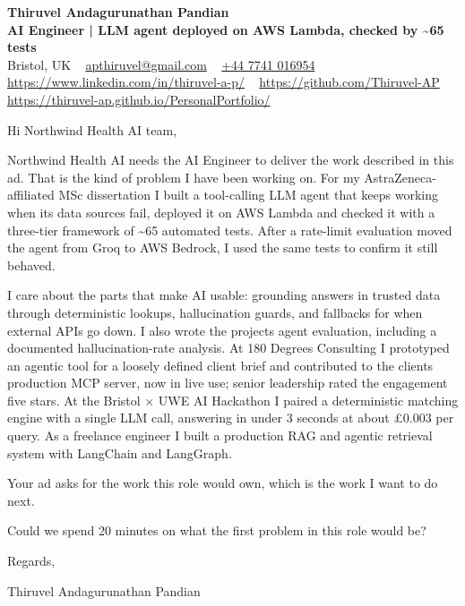 \documentclass[11pt,a4paper]{article}
\newcommand{\num}[1]{\textbf{#1}}   %
\begin{document}
\raggedright
\pagestyle{empty}

\begin{center}
    {\LARGE \color{linkblue} \textbf{Thiruvel Andagurunathan Pandian}}\\[0.2cm]
    {\color{headernavy}\small\textbf{AI Engineer | LLM agent deployed on AWS Lambda, checked by \num{\textasciitilde{}65} tests}}\\[0.2cm]
    {\small Bristol, UK\nobreak\ \,\textbar\, \href{mailto:apthiruvel@gmail.com}{apthiruvel@gmail.com}\nobreak\ \,\textbar\, \href{tel:+447741016954}{+44 7741 016954}\nobreak\ \,\textbar\, \href{https://www.linkedin.com/in/thiruvel-a-p/}{https://www.linkedin.com/in/thiruvel-a-p/}\nobreak\ \,\textbar\, \href{https://github.com/Thiruvel-AP}{https://github.com/Thiruvel-AP}\nobreak\ \,\textbar\, \href{https://thiruvel-ap.github.io/PersonalPortfolio/}{https://thiruvel-ap.github.io/PersonalPortfolio/}}

\end{center}

\vspace{0.4cm}

\noindent
Hi Northwind Health AI team,

Northwind Health AI needs the AI Engineer to deliver the work described in this ad. That is the kind of problem I have been working on. For my AstraZeneca-affiliated MSc dissertation I built a tool-calling LLM agent that keeps working when its data sources fail, deployed it on AWS Lambda and checked it with a three-tier framework of \textasciitilde{}65 automated tests. After a rate-limit evaluation moved the agent from Groq to AWS Bedrock, I used the same tests to confirm it still behaved.

I care about the parts that make AI usable: grounding answers in trusted data through deterministic lookups, hallucination guards, and fallbacks for when external APIs go down. I also wrote the project\textquotesingle{}s agent evaluation, including a documented hallucination-rate analysis. At 180 Degrees Consulting I prototyped an agentic tool for a loosely defined client brief and contributed to the client\textquotesingle{}s production MCP server, now in live use; senior leadership rated the engagement five stars. At the Bristol × UWE AI Hackathon I paired a deterministic matching engine with a single LLM call, answering in under 3 seconds at about £0.003 per query. As a freelance engineer I built a production RAG and agentic retrieval system with LangChain and LangGraph.

Your ad asks for the work this role would own, which is the work I want to do next.

Could we spend 20 minutes on what the first problem in this role would be?

\vspace{0.5cm}

Regards,

Thiruvel Andagurunathan Pandian
\end{document}
